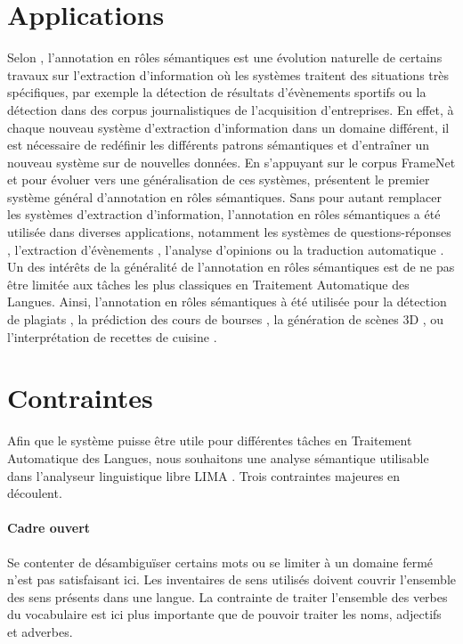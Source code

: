 \section{Applications}

Selon \cite{gildea2002automatic}, l'annotation en rôles sémantiques est une
évolution naturelle de certains travaux sur l'extraction d'information où les
systèmes traitent des situations très spécifiques, par exemple la détection de
résultats d'évènements sportifs ou la détection dans des corpus journalistiques
de l'acquisition d'entreprises. En effet, à chaque nouveau système d'extraction
d'information dans un domaine différent, il est nécessaire de redéfinir les
différents patrons sémantiques et d'entraîner un nouveau système sur de
nouvelles données. En s'appuyant sur le corpus FrameNet et pour évoluer vers
une généralisation de ces systèmes, \cite{gildea2002automatic} présentent le
premier système général d'annotation en rôles sémantiques. Sans pour autant
remplacer les systèmes d'extraction d'information, l'annotation en rôles
sémantiques a été utilisée dans diverses applications, notamment les systèmes
de questions-réponses \citep{shen2007using}, l'extraction d'évènements
\citep{exner2011using},  l'analyse d'opinions \citep{das2012structure} ou la
traduction automatique \citep{bazrafshan2013semantic}. Un des intérêts de la
généralité de l'annotation en rôles sémantiques est de ne pas être limitée aux
tâches les plus classiques en Traitement Automatique des Langues. Ainsi,
l'annotation en rôles sémantiques à été utilisée pour la détection de plagiats
\citep{osman2012improved}, la prédiction des cours de bourses
\citep{xie2013semantic}, la génération de scènes 3D \citep{chang2014semantic},
ou l'interprétation de recettes de cuisine \citep{malmaud2014cooking}.

\section{Contraintes}

Afin que le système puisse être utile pour différentes tâches en Traitement
Automatique des Langues, nous souhaitons une analyse sémantique utilisable dans
l'analyseur linguistique libre LIMA \citep{besancon2010lima}. Trois contraintes
majeures en découlent.

\paragraph{Cadre ouvert} Se contenter de désambiguïser certains mots ou se
limiter à un domaine fermé n'est pas satisfaisant ici. Les inventaires de sens
utilisés doivent couvrir l'ensemble des sens présents dans une langue. La
contrainte de traiter l'ensemble des verbes du vocabulaire est ici plus
importante que de pouvoir traiter les noms, adjectifs et adverbes.

